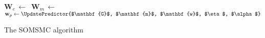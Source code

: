 \documentclass[a4paper]{article}
\begin{document}
\begin{algorithm}[H]
{{        $\mathbf{W}_e\,\leftarrow$\,\;
        $\mathbf{W}_m\,\leftarrow$\,\;       
        $\mathbf{w}_p\leftarrow\UpdatePredictor{$\mathbf{G}$, 
        	$\mathbf{m}$, $\mathbf{w}$, $\eta$, $\alpha$}$\;
                                    
        \BlankLine            

	}
}
\caption{The SOMSMC algorithm}
\label{smc3}
\end{algorithm}
\DecMargin{1em}
\end{document}
